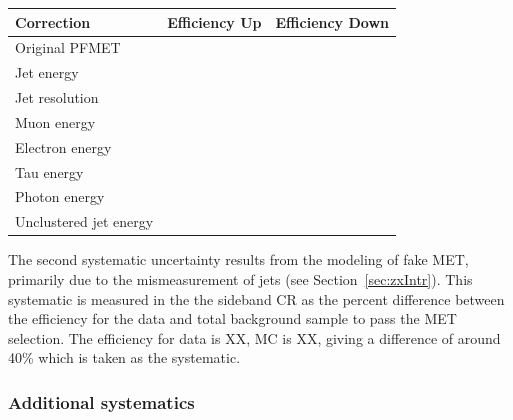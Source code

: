 \begin{table}[htbH]
\begin{center}
\label{tab:yields}
\begin{tabular}{ l | c | c }
\hline
\hline
Correction & Efficiency Up & Efficiency Down \\
\hline
Original PFMET & & \\
\hline
Jet energy & & \\
\hline
Jet resolution & & \\
\hline
Muon energy & & \\
\hline
Electron energy & & \\
\hline
Tau energy & & \\
\hline
Photon energy & & \\
\hline
Unclustered jet energy & & \\
\hline
\hline
\end{tabular}
\end{center}
\end{table}

The second systematic uncertainty results from the modeling of fake MET, primarily due to the mismeasurement of jets (see Section~\ref{sec:zxIntr}). This systematic is measured in the the sideband CR as the percent difference between the efficiency for the data and total background sample to pass the MET selection. The efficiency for data is XX, MC is XX, giving a difference of around 40\% which is taken as the systematic.

\subsubsection{Additional systematics}


